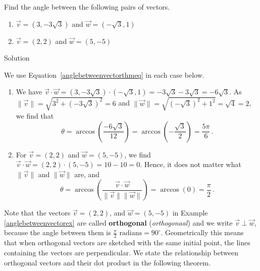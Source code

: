 \begin{example} \label{anglebetweenvectorex}  Find the angle between the following pairs of vectors.
\begin{multicols}{2}
\begin{enumerate}

\item  $\vec{v} = \left( 3, -3\sqrt{3} \right)$ and $\vec{w} = \left(-\sqrt{3}, 1 \right)$

\item  $\vec{v} = \left( 2, 2 \right)$ and $\vec{w} = \left(5, -5\right)$

\end{enumerate}
\end{multicols}

Solution 

We use Equation~\eqref{anglebetweenvectorthmeq} in each case below.

\begin{enumerate}

\item  We have $\vec{v} \cdot \vec{w} = \left( 3, -3\sqrt{3} \right) \cdot \left(-\sqrt{3}, 1 \right) = -3\sqrt{3} - 3\sqrt{3} = -6\sqrt{3}$.  As $\| \vec{v} \| = \sqrt{3^2+(-3\sqrt{3})^2}  =6$ and $\| \vec{w}\| = \sqrt{(-\sqrt{3})^2+1^2} = \sqrt{4} =2$,  we find that 
$$
\theta = \arccos\left(\frac{-6\sqrt{3}}{12}\right) = \arccos\left(-\frac{\sqrt{3}}{2}\right) = \frac{5\pi}{6}\,.
$$

\item  For $\vec{v} = \left( 2, 2 \right)$  and $\vec{w} = \left(5, -5\right)$, we find $\vec{v} \cdot \vec{w} = \left( 2, 2 \right) \cdot \left(5, -5\right) = 10-10 = 0$.  Hence, it does not matter what $\| \vec{v} \|$ and $\| \vec{w} \|$ are, and 
$$
\theta = \arccos\left( \frac{\vec{v} \cdot \vec{w}}{\| \vec{v} \| \|\vec{w} \|}\right) = \arccos(0) = \frac{\pi}{2}\,.
$$

\end{enumerate}
\end{example}

Note that the vectors $\vec{v} = \left( 2, 2 \right)$, and $\vec{w} = \left(5, -5\right)$ in Example \ref{anglebetweenvectorex} are called \textbf{orthogonal} (\textit{orthogonaal}) and we write $\vec{v} \perp \vec{w}$, because the angle between them is $\frac{\pi}{2} \mbox{ radians} = 90^{\circ}$.  Geometrically this means that when orthogonal vectors are sketched with the same initial point, the lines containing the vectors are perpendicular.  We state the relationship between orthogonal vectors and their dot product in the following theorem.

